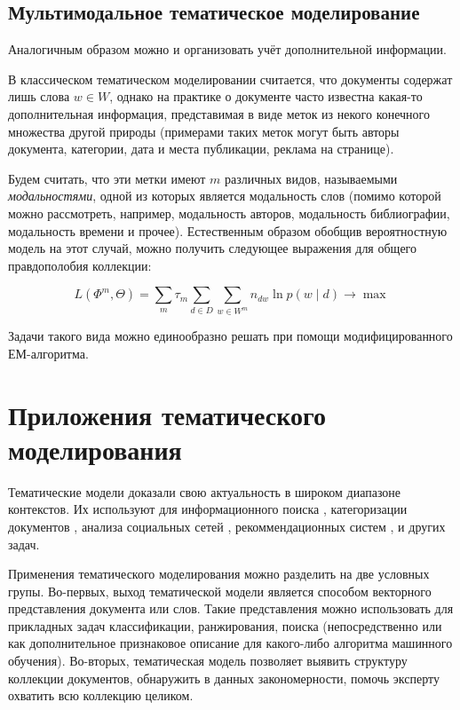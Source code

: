 \subsection{Мультимодальное тематическое моделирование}

Аналогичным образом можно и организовать учёт дополнительной информации. 

В классическом тематическом моделировании считается, что документы содержат лишь слова $w \in W$, однако на практике о документе часто известна какая-то дополнительная информация, представимая в виде меток из некого конечного множества другой природы (примерами таких меток могут быть авторы документа, категории, дата и места публикации, реклама на странице). 

Будем считать, что эти метки имеют $m$ различных видов, называемыми  \textit{модальностями}, одной из которых является модальность слов (помимо которой можно рассмотреть, например, модальность авторов, модальность библиографии, модальность времени и прочее). Естественным образом обобщив вероятностную модель на этот случай, можно получить следующее выражения для общего правдополобия коллекции:

\[
L(\Phi^m, \Theta) = \sum_m \tau_m \sum_{d\in D} \sum_{w \in W^m} n_{dw} \ln p(w \mid d) \rightarrow \max
\]

Задачи такого вида можно единообразно решать при помощи модифицированного ЕМ-алгоритма.

\section{Приложения тематического моделирования}



Тематические модели доказали свою актуальность в широком диапазоне контекстов\cite{fntir2017applications}. Их используют для информационного поиска \cite{yi2009, wang2011}, категоризации документов \cite{rubin2012}, анализа социальных сетей \cite{varshney2014, pinto2016}, рекоммендационных систем \cite{wang2011}, \cite{lee2015} и других задач.

Применения тематического моделирования можно разделить на две условных групы. Во-первых, выход тематической модели является способом векторного представления документа или слов. Такие представления можно использовать для прикладных задач классификации, ранжирования, поиска (непосредственно или как дополнительное признаковое описание для какого-либо алгоритма машинного обучения). Во-вторых, тематическая модель позволяет выявить структуру коллекции документов, обнаружить в данных закономерности, помочь эксперту охватить всю коллекцию целиком.

